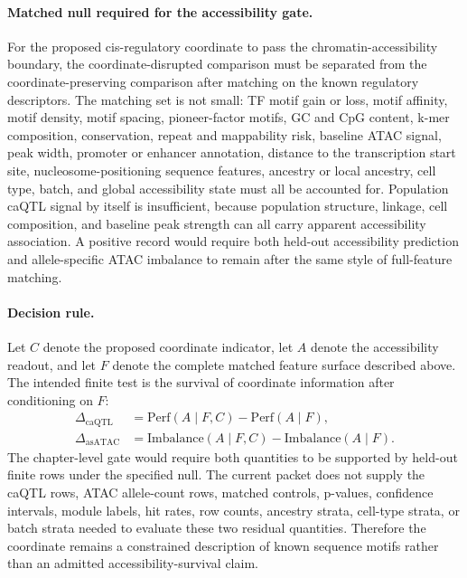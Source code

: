 \paragraph{Matched null required for the accessibility gate.}
For the proposed cis-regulatory coordinate to pass the chromatin-accessibility boundary, the coordinate-disrupted comparison must be separated from the coordinate-preserving comparison after matching on the known regulatory descriptors.  The matching set is not small: TF motif gain or loss, motif affinity, motif density, motif spacing, pioneer-factor motifs, GC and CpG content, k-mer composition, conservation, repeat and mappability risk, baseline ATAC signal, peak width, promoter or enhancer annotation, distance to the transcription start site, nucleosome-positioning sequence features, ancestry or local ancestry, cell type, batch, and global accessibility state must all be accounted for.  Population caQTL signal by itself is insufficient, because population structure, linkage, cell composition, and baseline peak strength can all carry apparent accessibility association.  A positive record would require both held-out accessibility prediction and allele-specific ATAC imbalance to remain after the same style of full-feature matching.

\paragraph{Decision rule.}
Let $C$ denote the proposed coordinate indicator, let $A$ denote the accessibility readout, and let $F$ denote the complete matched feature surface described above.  The intended finite test is the survival of coordinate information after conditioning on $F$:
$$
\begin{aligned}
\Delta_{\mathrm{caQTL}} &= \mathrm{Perf}(A \mid F,C) - \mathrm{Perf}(A \mid F),\\
\Delta_{\mathrm{asATAC}} &= \mathrm{Imbalance}(A \mid F,C) - \mathrm{Imbalance}(A \mid F).
\end{aligned}
$$
The chapter-level gate would require both quantities to be supported by held-out finite rows under the specified null.  The current packet does not supply the caQTL rows, ATAC allele-count rows, matched controls, p-values, confidence intervals, module labels, hit rates, row counts, ancestry strata, cell-type strata, or batch strata needed to evaluate these two residual quantities.  Therefore the coordinate remains a constrained description of known sequence motifs rather than an admitted accessibility-survival claim.

